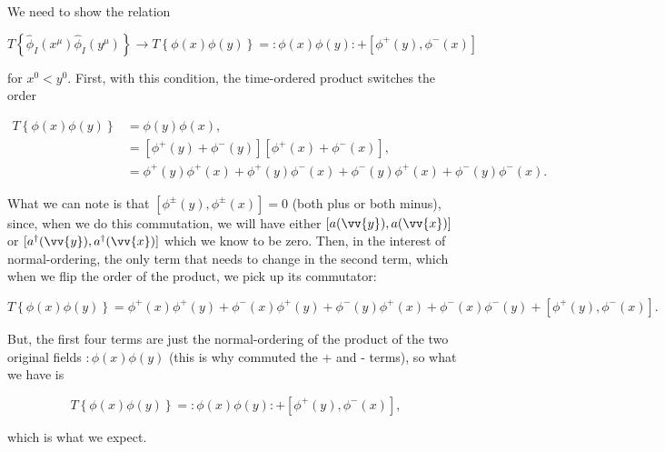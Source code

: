 \section{}

We need to show the relation

\begin{equation}
    T\left\{ \hat{\phi}_I(x^{\mu})\hat{\phi}_I(y^{\mu}) \right\} \rightarrow T\left\{ \phi(x)\phi(y) \right\} = :\phi(x)\phi(y): + \left[ \phi^+(y),\phi^-(x) \right]
\end{equation}

for $x^0 < y^0$. First, with this condition, the time-ordered product switches the order

\begin{align*}
    T\left\{ \phi(x)\phi(y) \right\} &= \phi(y)\phi(x), \\
    &= [\phi^+(y) + \phi^-(y)][\phi^+(x) + \phi^-(x)], \\
    &= \phi^+(y)\phi^+(x) + \phi^+(y)\phi^-(x) + \phi^-(y)\phi^+(x) + \phi^-(y)\phi^-(x).
\end{align*}

What we can note is that $[\phi^{\pm}(y),\phi^{\pm}(x)]=0$ (both plus or both minus), since, when we do this commutation, we will have either $[a(\vv{y}),a(\vv{x})]$ or $[a^{\dagger}(\vv{y}),a^{\dagger}(\vv{x})]$ which we know to be zero. Then, in the interest of normal-ordering, the only term that needs to change in the second term, which when we flip the order of the product, we pick up its commutator:

\begin{equation*}
    T\left\{ \phi(x)\phi(y) \right\} = \phi^+(x)\phi^+(y) + \phi^-(x)\phi^+(y) + \phi^-(y)\phi^+(x) + \phi^-(x)\phi^-(y) + [\phi^+(y),\phi^-(x)].
\end{equation*}

But, the first four terms are just the normal-ordering of the product of the two original fields $:\phi(x)\phi(y)$ (this is why commuted the + and - terms), so what we have is

\begin{equation*}
    T\left\{ \phi(x)\phi(y) \right\} = :\phi(x)\phi(y): + [\phi^+(y),\phi^-(x)],
\end{equation*}

which is what we expect.